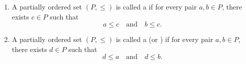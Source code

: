 \begin{definition}
\begin{enumerate}
        If $a \leq b$ or $b \leq a$ for $a,b \in P$, then we say that $a$ and $b$ are .

        \item A partially ordered set $(P, \leq)$ is called a  if for every pair $a,b \in P$, there exists $c \in P$ such that
        $$a \leq c \quad \text{and} \quad b \leq c.$$

        \item A partially ordered set $(P, \leq)$ is called a  (or ) if for every pair $a,b \in P$, there exists $d \in P$ such that
        $$d \leq a \quad \text{and} \quad d \leq b.$$
        \end{enumerate}
\end{definition}
